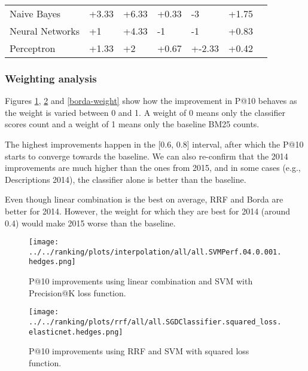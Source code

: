 \begin{table}[h]
{\begin{tabular}{@{}lllllll@{}}
Naive Bayes                                              & +3.33           & +6.33              & +0.33           & -3                & +1.75          \\
Neural Networks                                         & +1              & +4.33              & -1             & -1                & +0.83          \\
Perceptron                                              & +1.33           & +2                 & +0.67           & +-2.33             & +0.42         \\\bottomrule
\end{tabular}%
}
\end{table}

\subsubsection{Weighting analysis}

Figures \ref{interp-weight}, \ref{rrf-weight} and \ref{borda-weight} show how the improvement in P@10 behaves as the
weight is varied between 0 and 1. A weight of 0 means only the classifier scores count and a weight of 1 means
only the baseline BM25 counts.

The highest improvements happen in the [0.6, 0.8] interval, after which the P@10 starts to converge towards the baseline.
We can also re-confirm that the 2014 improvements are much higher than the ones from 2015, and in some cases (e.g., Descriptions
2014), the classifier alone is better than the baseline.

Even though linear combination is the best on average, RRF and Borda are better for 2014. However, the weight for which they are
best for 2014 (around 0.4) would make 2015 worse than the baseline.

\begin{figure}
\centerline{
  \texttt{[image: ../../ranking/plots/interpolation/all/all.SVMPerf.04.0.001.hedges.png]}
  }
  \caption{P@10 improvements using linear combination and SVM with Precision@K loss function.}
  \label{interp-weight}
\end{figure}

\begin{figure}
\centerline{
  \texttt{[image: ../../ranking/plots/rrf/all/all.SGDClassifier.squared\_loss.elasticnet.hedges.png]}
  }
  \caption{P@10 improvements using RRF and SVM with squared loss function.}
  \label{rrf-weight}
\end{figure}

